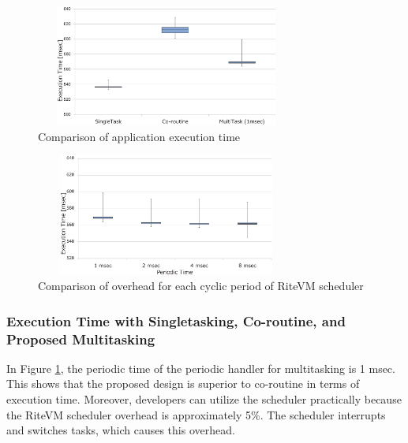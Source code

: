 \documentclass[conference]{IEEEtran/IEEEtran/IEEEtran}
\begin{document}
\begin{figure}[t]
    \centering
    \includegraphics[height=4.0cm,width=8.6cm,clip]{figure/comparison_s_c_m.eps}
    \vspace{-3mm}
\caption{Comparison of application execution time}
    \vspace{-3mm}
\label{fig:comparison_s_c_m}
\end{figure}
\begin{figure}[t]
    \centering
    \includegraphics[height=4.0cm,width=8.6cm,clip]{figure/comparison_msec.eps}
    \vspace{-3mm}
\caption{Comparison of overhead for each cyclic period of RiteVM scheduler}
    \vspace{-3mm}
\label{fig:comparison_msec}
\end{figure}
\subsubsection{Execution Time with Singletasking, Co-routine, and Proposed Multitasking}
In Figure \ref{fig:comparison_s_c_m}, the periodic time of the periodic handler for multitasking is 1 msec.
This shows that the proposed design is superior to co-routine in terms of execution time.
Moreover, developers can utilize the scheduler practically because the RiteVM scheduler overhead is approximately 5\%.
The scheduler interrupts and switches tasks, which causes this overhead.
\end{document}
